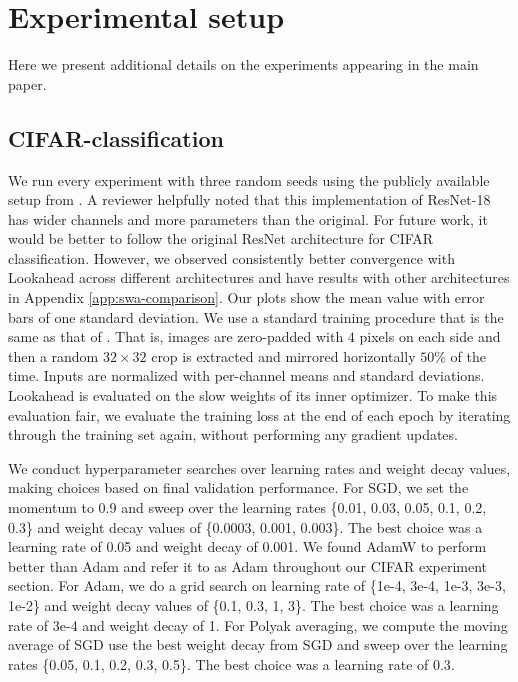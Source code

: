 \section{Experimental setup}
\label{app:experiments}

Here we present additional details on the experiments appearing in the main paper. 

\subsection{CIFAR-classification}
We run every experiment with three random seeds using the publicly available setup from \citep{devries2017improved}. A reviewer helpfully noted that this implementation of ResNet-18 has wider channels and more parameters than the original. For future work, it would be better to follow the original ResNet architecture for CIFAR classification. However, we observed consistently better convergence with Lookahead across different architectures and have results with other architectures in Appendix \ref{app:swa-comparison}. Our plots show the mean value with error bars of one standard deviation. We use a standard training procedure that is the same as that of \citet{Zagoruyko2016WRN}. That is, images are zero-padded with $4$ pixels on each side and then a random $32 \times 32$ crop is extracted and mirrored horizontally $50\%$ of the time. Inputs are normalized with per-channel means and standard deviations. Lookahead is evaluated on the slow weights of its inner optimizer. To make this evaluation fair, we evaluate the training loss at the end of each epoch by iterating through the training set again, without performing any gradient updates.

We conduct hyperparameter searches over learning rates and weight decay values, making choices based on final validation performance. For SGD, we set the momentum to 0.9 and sweep over the learning rates \{0.01, 0.03, 0.05, 0.1, 0.2, 0.3\} and weight decay values of \{0.0003, 0.001, 0.003\}. The best choice was a learning rate of 0.05 and weight decay of 0.001. We found AdamW \citep{loshchilov2017fixing} to perform better than Adam and refer it to as Adam throughout our CIFAR experiment section. For Adam, we do a grid search on learning rate of \{1e-4, 3e-4, 1e-3, 3e-3, 1e-2\} and weight decay values of \{0.1, 0.3, 1, 3\}. The best choice was a learning rate of 3e-4 and weight decay of 1. For Polyak averaging, we compute the moving average of SGD use the best weight decay from SGD and sweep over the learning rates \{0.05, 0.1, 0.2, 0.3, 0.5\}. The best choice was a learning rate of $0.3$.

